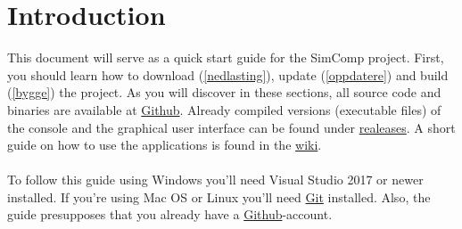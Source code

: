 \section{Introduction} \label{intro}
This document will serve as a quick start guide for the SimComp project.
First, you should learn how to download (\ref{nedlasting}), update (\ref{oppdatere}) and build (\ref{bygge}) the project. As you will discover in these sections, all source code and binaries are available at \href{https://github.com/LasseNatvig/SimComp}{Github}. Already compiled versions (executable files) of the console and the graphical user interface can be found under \href{https://github.com/LasseNatvig/SimComp/releases/tag/v1.0}{realeases}. A short guide on how to use the applications is found in the \href{https://github.com/LasseNatvig/SimComp/wiki}{wiki}.  
\\
\\
To follow this guide using Windows you'll need Visual Studio 2017 or newer installed. If you're using Mac OS or Linux you'll need \href{https://git-scm.com/downloads}{Git} installed. Also, the guide presupposes that you already have a \href{https://www.github.com}{Github}-account.